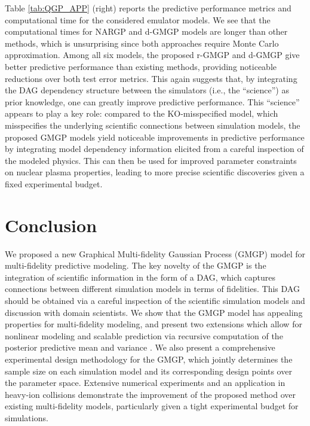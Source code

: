 \documentclass[12pt]{article}
\newcommand{\cbl}[1]{{\color{black}{#1}}}
\begin{document}
Table \ref{tab:QGP_APP} (right) reports the predictive performance metrics and computational time for the considered emulator models. We see that the computational times for NARGP and d-GMGP models are longer than other methods, which is unsurprising since both approaches require Monte Carlo approximation. Among all six models, the proposed r-GMGP and d-GMGP give better predictive performance than existing methods, providing noticeable reductions over both test error metrics. This again suggests that, by integrating the DAG dependency structure between the simulators (i.e., the ``science'') as prior knowledge, one can greatly improve predictive performance. This ``science'' appears to play a key role: compared to the KO-misspecified model, which misspecifies the underlying scientific connections between simulation models, the proposed GMGP models yield noticeable improvements in predictive performance by integrating model dependency information elicited from a careful inspection of the modeled physics. This can then be used for improved parameter constraints on nuclear plasma properties, leading to more precise scientific discoveries given a fixed experimental budget.


\section{Conclusion}
\label{sec:concl}

We proposed a new Graphical Multi-fidelity Gaussian Process (GMGP) model for multi-fidelity predictive modeling. The key novelty of the GMGP is the integration of scientific information in the form of a DAG, which captures connections between different simulation models in terms of fidelities. This DAG should be obtained via a careful inspection of the scientific simulation models and discussion with domain scientists. We show that the GMGP model has appealing properties for multi-fidelity modeling, and present two extensions which allow for nonlinear modeling and scalable prediction via recursive computation of the posterior predictive mean and variance \cbl{at each depth level of the DAG}. We also present a comprehensive experimental design methodology for the GMGP, which jointly determines the sample size on each simulation model and its corresponding design points over the parameter space. Extensive numerical experiments and an application in heavy-ion collisions demonstrate the improvement of the proposed method over existing multi-fidelity models, particularly given a tight experimental budget for simulations.
\end{document}

